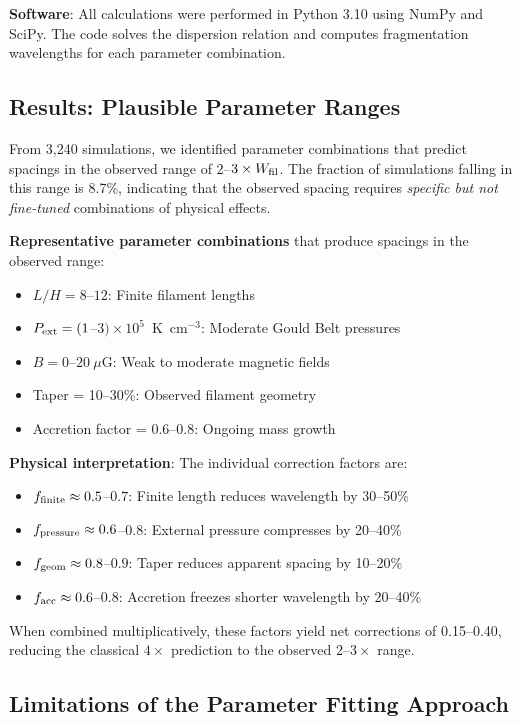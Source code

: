 \documentclass[11pt,a4paper]{article}
\begin{document}
\textbf{Software}: All calculations were performed in Python 3.10 using NumPy and SciPy. The code solves the dispersion relation and computes fragmentation wavelengths for each parameter combination.

\subsection{Results: Plausible Parameter Ranges}

From 3,240 simulations, we identified parameter combinations that predict spacings in the observed range of $2$--$3\times W_{\rm fil}$. The fraction of simulations falling in this range is 8.7\%, indicating that the observed spacing requires \textit{specific but not fine-tuned} combinations of physical effects.

\textbf{Representative parameter combinations} that produce spacings in the observed range:
\begin{itemize}
    \item $L/H = 8$--$12$: Finite filament lengths
    \item $P_{\rm ext} = (1$--$3) \times 10^5$~K~cm$^{-3}$: Moderate Gould Belt pressures
    \item $B = 0$--$20~\mu$G: Weak to moderate magnetic fields
    \item Taper = 10--30\%: Observed filament geometry
    \item Accretion factor = 0.6--0.8: Ongoing mass growth
\end{itemize}

\textbf{Physical interpretation}: The individual correction factors are:
\begin{itemize}
    \item $f_{\rm finite} \approx 0.5$--$0.7$: Finite length reduces wavelength by 30--50\%
    \item $f_{\rm pressure} \approx 0.6$--$0.8$: External pressure compresses by 20--40\%
    \item $f_{\rm geom} \approx 0.8$--$0.9$: Taper reduces apparent spacing by 10--20\%
    \item $f_{\rm acc} \approx 0.6$--$0.8$: Accretion freezes shorter wavelength by 20--40\%
\end{itemize}

When combined multiplicatively, these factors yield net corrections of 0.15--0.40, reducing the classical $4\times$ prediction to the observed $2$--$3\times$ range.

\subsection{Limitations of the Parameter Fitting Approach}
\end{document}
